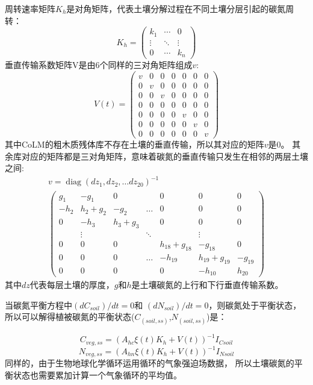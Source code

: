 周转速率矩阵$K_h$是对角矩阵，代表土壤分解过程在不同土壤分层引起的碳氮周转：
\begin{equation}
K_{h}=\left(\begin{array}{ccc}k_{1} & \cdots & 0 \\ \vdots & \ddots & \vdots \\ 0 & \cdots & k_{n}\end{array}\right)
\end{equation}
垂直传输系数矩阵V是由6个同样的三对角矩阵组成$v$:
\begin{equation}
V(t)=\left(\begin{array}{ccccccc}v & 0 & 0 & 0 & 0 & 0 & 0 \\ 0 & v & 0 & 0 & 0 & 0 & 0 \\ 0 & 0 & v & 0 & 0 & 0 & 0 \\ 0 & 0 & 0 & 0 & 0 & 0 & 0 \\ 0 & 0 & 0 & 0 & v & 0 & 0 \\ 0 & 0 & 0 & 0 & 0 & v & 0 \\ 0 & 0 & 0 & 0 & 0 & 0 & v\end{array}\right)
\end{equation}
其中CoLM的粗木质残体库不存在土壤的垂直传输，所以其对应的矩阵$v$是0。
其余库对应的矩阵都是三对角矩阵，意味着碳氮的垂直传输只发生在相邻的两层土壤之间:
\begin{equation}
\begin{array}{c}v=\operatorname{diag}\left(d z_{1}, d z_{2}, \ldots d z_{20}\right)^{-1} \\ 
  \left(\begin{array}{ccccccc}g_{1} & -g_{1} & 0 & & 0 & 0 & 0 \\
     -h_{2} & h_{2}+g_{2} & -g_{2} & \ldots & 0 & 0 & 0 \\ 0 & -h_{3} & h_{3}+g_{3} & & 0 & 0 & 0 \\
      & \vdots & & \ddots & & \vdots & \\ 0 & 0 & 0 & & h_{18}+g_{18} & -g_{18} & 0 \\
     0 & 0 & 0 & \ldots & -h_{19} & h_{19}+g_{19} & -g_{19} \\ 0 & 0 & 0 & & 0 & -h_{10} & h_{20}\end{array}\right)\end{array}
\end{equation}
其中$dz$代表每层土壤的厚度，$g$和$h$是土壤碳氮的上行和下行垂直传输系数。

当碳氮平衡方程中$(dC_{soil})/dt=0$和 $(dN_{soil})/dt=0$，则碳氮处于平衡状态，
所以可以解得植被碳氮的平衡状态($C_{(soil,ss)}$,$N_{(soil,ss)}$)是：

\begin{equation}
C_{veg, s s}=\left(A_{h c} \xi(t) K_{h}+V(t)\right)^{-1} I_{C s o i l}
\end{equation}
\begin{equation}
N_{veg, s s}=\left(A_{h n} \xi(t) K_{h}+V(t)\right)^{-1} I_{N s o i l}
\end{equation}
同样的，由于生物地球化学循环运用循环的气象强迫场数据，
所以土壤碳氮的平衡状态也需要累加计算一个气象循环的平均值。 









